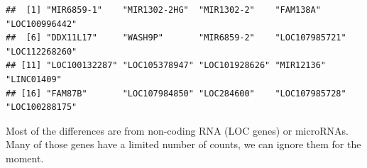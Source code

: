 \documentclass[
]{book}
\newenvironment{Shaded}{\begin{snugshade}}{\end{snugshade}}
\newcommand{\AttributeTok}[1]{\textcolor[rgb]{0.13,0.29,0.53}{#1}}
\newcommand{\DecValTok}[1]{\textcolor[rgb]{0.00,0.00,0.81}{#1}}
\newcommand{\FunctionTok}[1]{\textcolor[rgb]{0.13,0.29,0.53}{\textbf{#1}}}
\newcommand{\NormalTok}[1]{#1}
\newcommand{\OtherTok}[1]{\textcolor[rgb]{0.56,0.35,0.01}{#1}}
\newcommand{\SpecialCharTok}[1]{\textcolor[rgb]{0.81,0.36,0.00}{\textbf{#1}}}
\begin{document}
\begin{Shaded}
\end{Shaded}

\begin{verbatim}
##  [1] "MIR6859-1"    "MIR1302-2HG"  "MIR1302-2"    "FAM138A"      "LOC100996442"
##  [6] "DDX11L17"     "WASH9P"       "MIR6859-2"    "LOC107985721" "LOC112268260"
## [11] "LOC100132287" "LOC105378947" "LOC101928626" "MIR12136"     "LINC01409"   
## [16] "FAM87B"       "LOC107984850" "LOC284600"    "LOC107985728" "LOC100288175"
\end{verbatim}

Most of the differences are from non-coding RNA (LOC genes) or microRNAs. Many of those genes have a limited number of counts, we can ignore them for the moment.

\begin{Shaded}
\end{Shaded}
\end{document}
